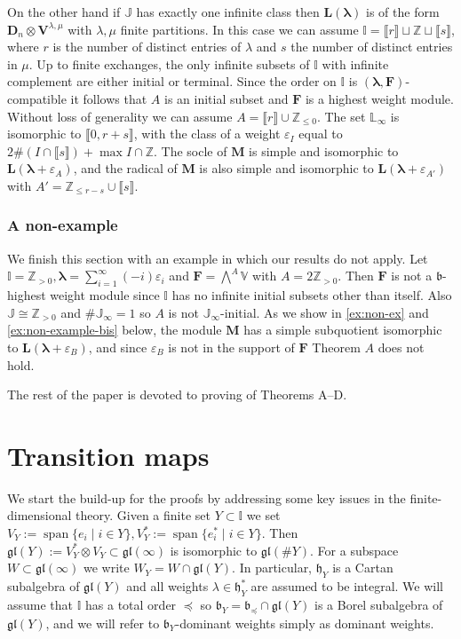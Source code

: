\documentclass[11pt,fleqn]{amsart}
\newcommand\ZZ{\mathbb Z}
\newcommand\II{\mathbb I}
\newcommand\JJ{\mathbb J}
\newcommand\LL{\mathbb L}
\renewcommand\epsilon{\varepsilon}
\theoremstyle{definition}
\theoremstyle{remark}
\theoremstyle{remark}
\newcommand\VV{\mathbb V}
\newcommand\gl{\mathfrak{gl}}
\newcommand\interval[1]{\llbracket{#1}\rrbracket}
\newcommand\lie[1]{\mathfrak{#1}}
\newcommand\wt[1]{\boldsymbol{#1}}
\newcommand\vspan[1]{\operatorname{span}{\{#1\}}}
\begin{document}
On the other hand if $\JJ$ has exactly one infinite class then $\mathbf 
L(\wt\lambda)$ is of the form $\mathbf D_n \otimes \mathbf V^{\lambda, 
\mu}$ with $\lambda, \mu$ finite partitions. In this case we can assume $\II  
= \interval{r} \sqcup \ZZ \sqcup \interval{s}$, where $r$ is the number of 
distinct entries of $\lambda$ and $s$ the number of distinct entries in $\mu$.
Up to finite exchanges, the only infinite subsets of $\II$ with infinite 
complement are either initial or terminal. Since the order on $\II$ is $(\wt
\lambda, \mathbf F)$-compatible it follows that $A$ is an initial subset and 
$\mathbf F$ is a highest weight module. Without loss of generality we can 
assume $A = \interval{r} \cup \ZZ_{\leq 0}$.
The set $\LL_\infty$ is isomorphic to $\interval{0,r+s}$, with the class of a 
weight $\epsilon_I$ equal to $2 \#(I \cap \interval s) + \max I \cap \ZZ$. The 
socle of $\mathbf M$ is simple and isomorphic to $\mathbf L(\wt\lambda + 
\epsilon_A)$, and the radical of $\mathbf M$ is also simple and isomorphic to 
$\mathbf L(\wt\lambda + \epsilon_{A'})$ with $A' = \ZZ_{\leq r-s} \cup 
\interval s$.

\subsubsection{A non-example}
We finish this section with an example in which our results do not apply. Let 
$\II = \ZZ_{>0}, \wt\lambda = \sum_{i=1}^\infty (-i)\epsilon_i$ and $\mathbf F
= \bigwedge^A \VV$ with $A = 2\ZZ_{>0}$. Then $\mathbf F$ is not a $\lie 
b$-highest weight module since $\II$ has no infinite initial subsets 
other than itself. Also $\JJ \cong \ZZ_{>0}$ and $\# \JJ_\infty = 1$ so $A$
is not $\JJ_\infty$-initial. As we show in \ref{ex:non-ex} and
\ref{ex:non-example-bis} below, the module $\mathbf M$ has a 
simple subquotient isomorphic to $\mathbf L(\wt\lambda + \epsilon_B)$, and 
since $\epsilon_B$ is not in the support of $\mathbf F$ Theorem $A$ does not 
hold.

\bigskip

The rest of the paper is devoted to proving of Theorems A--D.


\section{Transition maps}
We start the build-up for the proofs by addressing some key issues in the 
finite-dimensional theory.
Given a finite set $Y \subset \II$ we set $V_Y := \vspan{e_i \mid i \in Y}, 
V_Y^* := \vspan{e_i^* \mid i \in Y}$. Then $\gl(Y) := V_Y^* \otimes V_Y 
\subset \gl(\infty)$ is isomorphic to $\gl(\# Y)$. For a subspace $W \subset 
\gl(\infty)$ we write $W_Y = W \cap \gl(Y)$. In particular, $\lie h_Y$ is a 
Cartan subalgebra of $\gl(Y)$ and all weights $\lambda \in \lie h^*_Y$ are 
assumed to be integral. We will assume that $\II$ has a total order 
$\preceq$ so $\lie b_Y = \lie b_{\preceq} \cap \gl(Y)$ is a Borel subalgebra 
of $\gl(Y)$, and we will refer to $\lie b_Y$-dominant weights simply as 
dominant weights. 
\end{document}
